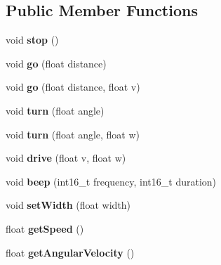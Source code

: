 \subsection*{Public Member Functions}
\begin{DoxyCompactItemize}
\item 
\mbox{\label{class_robot_a14dfe126ae973d3b9f81fee81a06ac22}} 
void {\bfseries stop} ()
\item 
\mbox{\label{class_robot_a554d03cb14b5f9eb2baa2175c8ad5f8f}} 
void {\bfseries go} (float distance)
\item 
\mbox{\label{class_robot_a8ad50ea5e4b3811c8b02201e5a33a580}} 
void {\bfseries go} (float distance, float v)
\item 
\mbox{\label{class_robot_a58ed326079adb3283b4129a92fa60097}} 
void {\bfseries turn} (float angle)
\item 
\mbox{\label{class_robot_adda1098497a37d2676dcc64e0021232c}} 
void {\bfseries turn} (float angle, float w)
\item 
\mbox{\label{class_robot_aa5029f34e3f16790254c9a4c46881199}} 
void {\bfseries drive} (float v, float w)
\item 
\mbox{\label{class_robot_a519f7c469542d18cbc374ab5e60e1a02}} 
void {\bfseries beep} (int16\+\_\+t frequency, int16\+\_\+t duration)
\item 
\mbox{\label{class_robot_a25e965fa83c65b5f1d9bfca6aa5290c4}} 
void {\bfseries set\+Width} (float width)
\item 
\mbox{\label{class_robot_ac3dc9aec2bd1f59314f97a5fbe8db988}} 
float {\bfseries get\+Speed} ()
\item 
\mbox{\label{class_robot_a919a05ad3d64b1d83febe2baccf57c42}} 
float {\bfseries get\+Angular\+Velocity} ()
\end{DoxyCompactItemize}
